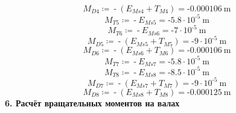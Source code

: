 \documentclass{article}
\newcommand{\defeq}{\coloneq} %
\begin{document}
\begin{equation*}
\textit{M}_{\textit{D4}} \defeq  \operatorname{-} \left( \textit{E}_{\textit{Ms4}}+\textit{T}_{\textit{M4}} \right) = { \operatorname{-} 0.000106 \: \mathrm{m}}
\end{equation*}
\begin{equation*}
\textit{M}_{\textit{T5}} \defeq  \operatorname{-} \textit{E}_{\textit{Ms5}} = { \operatorname{-} 5.8 \cdot 10^{ \operatorname{-} 5} \: \mathrm{m}}
\end{equation*}
\begin{equation*}
\textit{M}_{\textit{T6}} \defeq  \operatorname{-} \textit{E}_{\textit{Ms6}} = { \operatorname{-} 7 \cdot 10^{ \operatorname{-} 5} \: \mathrm{m}}
\end{equation*}
\begin{equation*}
\textit{M}_{\textit{D5}} \defeq  \operatorname{-} \left( \textit{E}_{\textit{Ms5}}+\textit{T}_{\textit{M5}} \right) = { \operatorname{-} 9 \cdot 10^{ \operatorname{-} 5} \: \mathrm{m}}
\end{equation*}
\begin{equation*}
\textit{M}_{\textit{D6}} \defeq  \operatorname{-} \left( \textit{E}_{\textit{Ms6}}+\textit{T}_{\textit{M6}} \right) = { \operatorname{-} 0.000106 \: \mathrm{m}}
\end{equation*}
\begin{equation*}
\textit{M}_{\textit{T7}} \defeq  \operatorname{-} \textit{E}_{\textit{Ms7}} = { \operatorname{-} 5.8 \cdot 10^{ \operatorname{-} 5} \: \mathrm{m}}
\end{equation*}
\begin{equation*}
\textit{M}_{\textit{T8}} \defeq  \operatorname{-} \textit{E}_{\textit{Ms8}} = { \operatorname{-} 8.5 \cdot 10^{ \operatorname{-} 5} \: \mathrm{m}}
\end{equation*}
\begin{equation*}
\textit{M}_{\textit{D7}} \defeq  \operatorname{-} \left( \textit{E}_{\textit{Ms7}}+\textit{T}_{\textit{M7}} \right) = { \operatorname{-} 9 \cdot 10^{ \operatorname{-} 5} \: \mathrm{m}}
\end{equation*}
\begin{equation*}
\textit{M}_{\textit{D8}} \defeq  \operatorname{-} \left( \textit{E}_{\textit{Ms8}}+\textit{T}_{\textit{M8}} \right) = { \operatorname{-} 0.000125 \: \mathrm{m}}
\end{equation*}
\colorbox[HTML]{000000}{\textbf{6. Расчёт вращательных моментов на валах}}\newline
\end{document}
